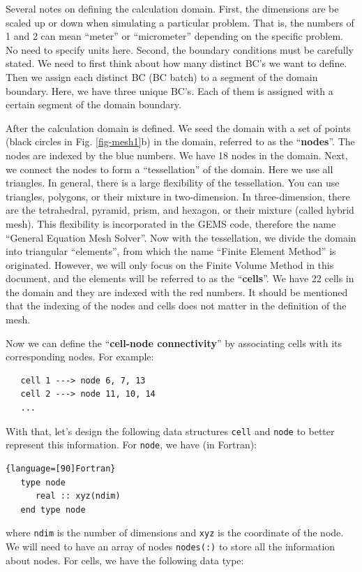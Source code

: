 \documentclass[12pt, letterpaper]{report}
\begin{document}
Several notes on defining the calculation domain. First, the dimensions are be scaled up or down
when simulating a particular problem. That is, the numbers of 1 and 2 can mean ``meter'' or
``micrometer'' depending on the specific problem. No need to specify units here. Second, the
boundary conditions must be carefully stated. We need to first think about how many distinct BC's we
want to define. Then we assign each distinct BC (BC batch) to a segment of the domain boundary. Here,
we have three unique BC's. Each of them is assigned with a certain segment of the domain boundary.
\paraspace

After the calculation domain is defined. We seed the domain with a set of points (black circles in
Fig. \ref{fig-mesh1}b) in the domain, referred to as the ``{\bf nodes}''. The nodes are indexed by
the blue numbers. We have 18 nodes in the domain. Next, we connect the nodes to form a
``tessellation'' of the domain. Here we use all triangles. In general, there is a large flexibility
of the tessellation. You can use triangles, polygons, or their mixture in two-dimension. In
three-dimension, there are the tetrahedral, pyramid, prism, and hexagon, or their mixture (called
hybrid mesh). This flexibility is incorporated in the GEMS code, therefore the name ``General
Equation Mesh Solver''.  Now with the tessellation, we divide the domain into triangular
``elements'', from which the name ``Finite Element Method'' is originated. However, we will only
focus on the Finite Volume Method in this document, and the elements will be referred to as the
``{\bf cells}''. We have 22 cells in the domain and they are indexed with the red numbers. It should
be mentioned that the indexing of the nodes and cells does not matter in the definition of the mesh.
\paraspace

Now we can define the ``{\bf cell-node connectivity}'' by associating cells with its corresponding
nodes. For example:
\begin{verbatim}
   cell 1 ---> node 6, 7, 13
   cell 2 ---> node 11, 10, 14
   ...
\end{verbatim}
With that, let's design the following data structures \verb+cell+ and \verb+node+ to better
represent this information. For \verb+node+, we have (in Fortran):

\begin{lstlisting}{language=[90]Fortran}
   type node
      real :: xyz(ndim)
   end type node
\end{lstlisting}

where \verb+ndim+ is the number of dimensions and \verb+xyz+ is the coordinate of the node. We will
need to have an array of nodes \verb+nodes(:)+ to store all the information about nodes. For cells,
we have the following data type:
\end{document}
